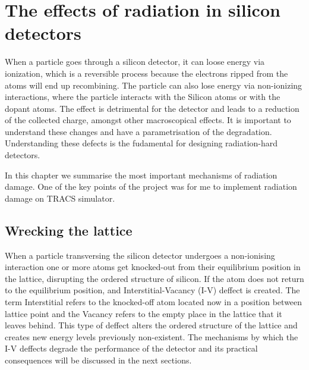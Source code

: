 \chapter{The effects of radiation in silicon detectors}%
\label{sec:rad}

When a particle goes through a silicon detector, it can loose energy via ionization, which is a reversible process because the electrons ripped from the atoms will end up recombining. The particle can also lose energy via non-ionizing interactions, where the particle interacts with the Silicon atoms or with the dopant atoms. The effect is detrimental for the detector and leads to a reduction of the collected charge, amongst other macroscopical effects. It is important to understand these changes and have a parametrisation of the degradation. Understanding these defects is the fudamental for designing radiation-hard detectors.

In this chapter we summarise the most important mechanisms of radiation damage. One of the key points of the project was for me to implement radiation damage on TRACS simulator.


\section{Wrecking the lattice}%

When a particle transversing the silicon detector undergoes a non-ionising interaction one or more atoms get knocked-out from their equilibrium position in the lattice, disrupting the ordered structure of silicon. If the atom does not return to the equilibrium position, and Interstitial-Vacancy (I-V) deffect is created. The term Interstitial refers to the knocked-off atom located now in a position between lattice point and the Vacancy refers to the empty place in the lattice that it leaves behind. This type of deffect alters the ordered structure of the lattice and creates new energy levels previously non-existent. The mechanisms by which the I-V deffects degrade the performance of the detector and its practical consequences will be discussed in the next sections.


